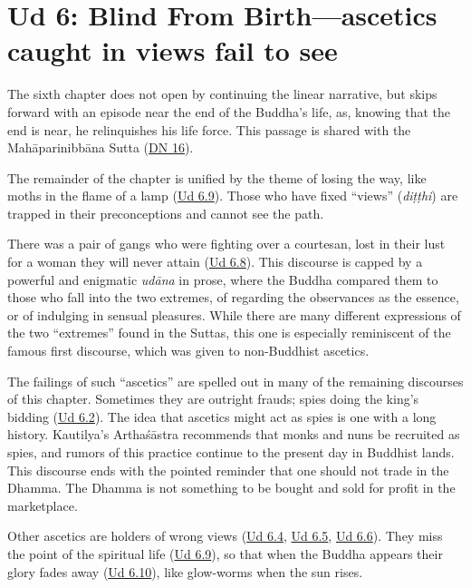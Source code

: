 \documentclass[12pt,openany]{book}%
\begin{document}
\section*{Ud 6: Blind From Birth—ascetics caught in views fail to see}

The sixth chapter does not open by continuing the linear narrative, but skips forward with an episode near the end of the Buddha’s life, as, knowing that the end is near, he relinquishes his life force. This passage is shared with the \textsanskrit{Mahāparinibbāna} Sutta (\href{https://suttacentral.net/dn16/en/sujato}{DN 16}). 

The remainder of the chapter is unified by the theme of losing the way, like moths in the flame of a lamp (\href{https://suttacentral.net/ud6.9/en/sujato}{Ud 6.9}). Those who have fixed “views” (\textit{\textsanskrit{diṭṭhi}}) are trapped in their preconceptions and cannot see the path.

There was a pair of gangs who were fighting over a courtesan, lost in their lust for a woman they will never attain (\href{https://suttacentral.net/ud6.8/en/sujato}{Ud 6.8}). This discourse is capped by a powerful and enigmatic \textit{\textsanskrit{udāna}} in prose, where the Buddha compared them to those who fall into the two extremes, of regarding the observances as the essence, or of indulging in sensual pleasures. While there are many different expressions of the two “extremes” found in the Suttas, this one is especially reminiscent of the famous first discourse, which was given to non-Buddhist ascetics.

The failings of such “ascetics” are spelled out in many of the remaining discourses of this chapter. Sometimes they are outright frauds; spies doing the king’s bidding (\href{https://suttacentral.net/ud6.2/en/sujato}{Ud 6.2}). The idea that ascetics might act as spies is one with a long history. Kautilya’s \textsanskrit{Arthaśāstra} recommends that monks and nuns be recruited as spies, and rumors of this practice continue to the present day in Buddhist lands. This discourse ends with the pointed reminder that one should not trade in the Dhamma. The Dhamma is not something to be bought and sold for profit in the marketplace.

Other ascetics are holders of wrong views (\href{https://suttacentral.net/ud6.4/en/sujato}{Ud 6.4}, \href{https://suttacentral.net/ud6.5/en/sujato}{Ud 6.5}, \href{https://suttacentral.net/ud6.6/en/sujato}{Ud 6.6}). They miss the point of the spiritual life (\href{https://suttacentral.net/ud6.9/en/sujato}{Ud 6.9}), so that when the Buddha appears their glory fades away (\href{https://suttacentral.net/ud6.10/en/sujato}{Ud 6.10}), like glow-worms when the sun rises.
\end{document}
